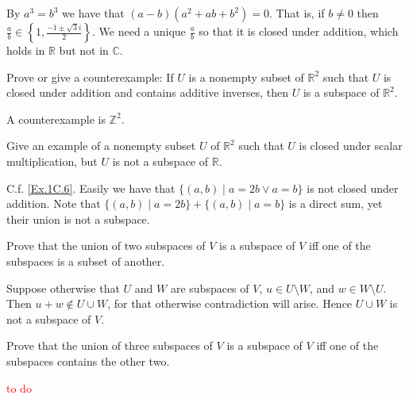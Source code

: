 By $a^3=b^3$ we have that $(a-b)(a^2+ab+b^2)=0$. That is, if $b\neq0$ then $\displaystyle\frac{a}{b}\in\left\{1,\frac{-1\pm\sqrt{3}i}{2}\right\}$. We need a unique $\displaystyle\frac{a}{b}$ so that it is closed under addition, which holds in $\mathbb R$ but not in $\mathbb C$.

\begin{exercise}
  Prove or give a counterexample: If $U$ is a nonempty subset of $\mathbb{R}^2$ such that $U$ is closed under addition and contains additive inverses, then $U$ is a subspace of $\mathbb{R}^2$.
\end{exercise}

A counterexample is $\mathbb Z^2$.

\begin{exercise}
  Give an example of a nonempty subset $U$ of $\mathbb R^2$ such that $U$ is closed under scalar multiplication, but $U$ is not a subspace of $\mathbb R$.
\end{exercise}

C.f. \ref{Ex.1C.6}. Easily we have that $\{(a,b)\mid a=2b\vee a=b\}$ is not closed under addition. Note that $\{(a,b)\mid a=2b\}+\{(a,b)\mid a=b\}$ is a direct sum, yet their union is not a subspace.

\setcounter{exercise}{11}

\begin{exercise}
  Prove that the union of two subspaces of $V$ is a subspace of $V$ iff one of the subspaces is a subset of another.
\end{exercise}

Suppose otherwise that $U$ and $W$ are subspaces of $V$, $u\in U\setminus W$, and $w\in W\setminus U$. Then $u+w\notin U\cup W$, for that otherwise contradiction will arise. Hence $U\cup W$ is not a subspace of $V$.

\begin{exercise}
  Prove that the union of three subspaces of $V$ is a subspace of $V$ iff one of the subspaces contains the other two.
\end{exercise}

\textcolor{red}{to do}

